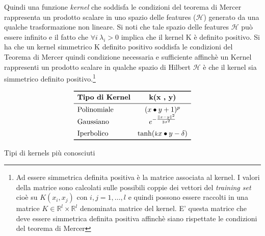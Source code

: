 Quindi una funzione \textit{kernel} che soddisfa le condizioni del teorema di Mercer rappresenta un prodotto scalare in uno spazio delle features ($\mathcal{H}$) generato da una qualche trasformazione non lineare. Si noti che tale spazio delle features $\mathcal{H}$ può essere infinito e il fatto che $\forall i \:\lambda_i > 0$ implica che il kernel K è definito positivo. Si ha che un kernel simmetrico K definito positivo soddisfa le condizioni del Teorema di Mercer quindi condizione necessaria e sufficiente affinchè un Kernel rappresenti un prodotto scalare in qualche spazio di Hilbert $\mathcal{H}$ è che il kernel sia simmetrico definito positivo.\footnote{Ad essere simmetrica definita positiva è la matrice associata al kernel. I valori della matrice sono calcolati sulle possibili coppie dei vettori del \textit{training set} cioè su $K(x_i,x_j) \text{ con } i,j=1,\dots,l$ e quindi possono essere raccolti in una matrice $K \in \mathbb{R}^l \times \mathbb{R}^l$ denominata matrice del kernel. E' questa matrice che deve essere simmetrica definita positiva affinchè siano rispettate le condizioni del teorema di Mercer} 

\begin{table}[htp]
\centering
\[ 
\begin{array}{lc} 
\toprule
\text{\textbf{Tipo di Kernel}} & \text{\textbf{k(x , y)}}  \\
\midrule  
\text{Polinomiale}  &  (x \bullet y +1)^p \\
\text{Gaussiano}  &  e^{-\frac{\norma{x-y}^{2}}{2\sigma^2}}\\[1ex]
\text{Iperbolico}  & \tanh(\text{{\footnotesize {\textsl k}}}x \bullet y - \delta) \\

\bottomrule
\end{array}
\]
 \caption[Kernels più noti]{Tipi di kernels più conosciuti}
\label{tab:kerrem}
\end{table}  

